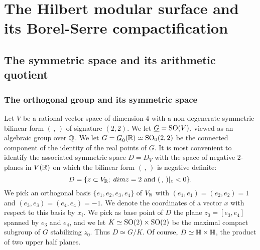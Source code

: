\section{The Hilbert modular surface and  its Borel-Serre compactification}


\subsection{The symmetric space and its arithmetic quotient}

\subsubsection{The orthogonal group and its symmetric space}


Let $V$ be a rational vector space of dimension $4$ with a
non-degenerate symmetric bilinear form  $(\,,\,)$ of signature
$(2,2)$.
We let $\underline{G} = \operatorname{SO}(V)$, viewed as an algebraic group over $\mathbb{Q}$.
We let $G=\underline{G}_0(\mathbb{R}) \simeq \operatorname{SO}_0(2,2)$ be the connected component of the identity of the real points of $\underline{G}$.
It is most convenient to identify the associated symmetric space $D= D_V$ with the
space of negative $2$-planes in $V(\mathbb{R})$ on which the bilinear form $(\,,\,)$ is
negative definite:
\[
D = \{z \subset V_{\mathbb{R}} ; \;\text{$dim z =2$ and $(\,,\,)|_z < 0$}
\}.
\]
We pick an orthogonal basis $\{e_1,e_2,e_3,e_4\}$ of $V_{\mathbb{R}}$ with $(e_1,e_1)=(e_2,e_2)=1$ and $(e_3,e_3)=(e_4,e_4)=-1$. We denote the coordinates of a vector $x$ with respect to this basis by $x_i$. We pick as base point of $D$ the plane $z_0=[e_3,e_4]$ spanned by $e_3$ and $e_4$, and we let $K \simeq \operatorname{SO}(2)\times \operatorname{SO}(2)$ be the maximal compact subgroup of $G$ stabilizing $z_0$. Thus $D \simeq G/K$. Of course, $D \simeq \mathbb{H} \times \mathbb{H}$, the product of two upper half planes. 


